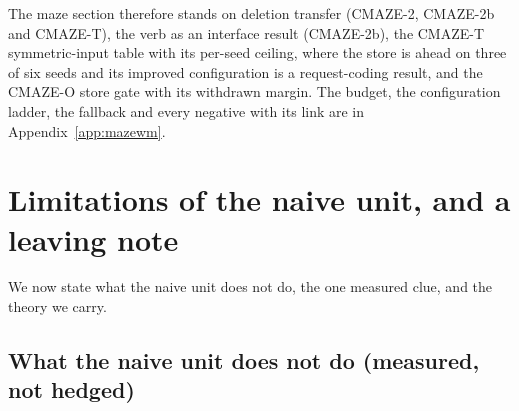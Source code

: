 \documentclass{article} %
\begin{document}
The maze section therefore stands on deletion transfer (CMAZE-2, CMAZE-2b and CMAZE-T), the verb as
an interface result (CMAZE-2b), the CMAZE-T symmetric-input table with its per-seed ceiling, where the
store is ahead on three of six seeds and its improved configuration is a request-coding result, and
the CMAZE-O store gate with its withdrawn margin. The budget, the configuration ladder, the fallback
and every negative with its link are in Appendix~\ref{app:mazewm}.

\section{Limitations of the naive unit, and a leaving note}
\label{sec:limits}

We now state what the naive unit does not do, the one measured clue, and the theory we carry.
\subsection{What the naive unit does not do (measured, not hedged)}
\label{sec:limits-list}
\end{document}
